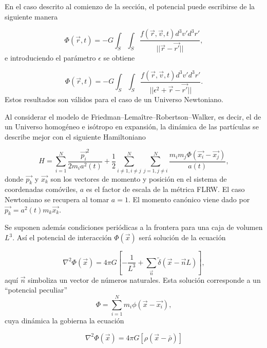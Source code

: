 \documentclass[a4paper,openright,12pt]{book}
\begin{document}
En el caso descrito al comienzo de la sección, el potencial puede escribirse de la siguiente manera

\begin{equation}
  \Phi(\vec{r},t)
  = -G
  \int_{S}\int_{S}
  \frac{f(\vec{r}, \vec{v}, t)d^{3}v'd^{3}r'}{||\vec{r}-\vec{r'}||},\label{eqn2.8}
\end{equation}
e introduciendo el parámetro $\epsilon$ se obtiene

\begin{equation}
 \Phi(\vec{r},t)
  = -G
  \int_{S}\int_{S}
  \frac{f(\vec{r}, \vec{v}, t)d^{3}v'd^{3}r'}{||\epsilon^{2} + \vec{r}-\vec{r'}||}.\label{eqn2.9}
\end{equation}
Estos resultados son válidos para el caso de un Universo Newtoniano.

Al considerar el modelo de Friedman--Lemaître--Robertson--Walker, es decir, el de un Universo homogéneo e isótropo en expansión, la dinámica de las partículas se describe mejor con el siguiente Hamiltoniano

\begin{equation}
  H 
  = \sum_{i=1}^{N} \frac{\vec{p_{i}}^{2}}{2 m_{i} a^{2}(t)} 
  +
  \frac{1}{2} \sum_{i\not=1,i\not=j}^{N}\sum_{j=1,j\not=i}^{N}
  \frac{m_{i}m_{j}\Phi(\vec{x_{i}}-\vec{x_{j}})}{a(t)},\label{eqn2.10}
\end{equation}
donde $\vec{p_{k}}$ y $\vec{x_{k}}$ son los vectores de momento y posición en el sistema de coordenadas comóviles, $a$ es el factor de escala de la métrica FLRW. El caso Newtoniano se recupera al tomar $a = 1$. El momento canónico viene dado por $\vec{p_{k}} = a^{2}(t)m_{k}\vec{x_{k}}$.

Se suponen además condiciones periódicas a la frontera para una caja de volumen $L^{3}$. Así el potencial de interacción $\Phi(\vec{x})$ será solución de la ecuación

\begin{equation}
 \nabla^{2}\Phi(\vec{x})
 =
 4\pi G
 \left[
 -\frac{1}{L^{3}}
 +
 \sum_{\vec{n}} \tilde{\delta}(\vec{x}-\vec{n}L)
 \right],\label{eqn2.11}
\end{equation}
aquí $\vec{n}$ simboliza un vector de números naturales. Esta solución corresponde a un “potencial peculiar”
\begin{equation}
 \Phi
 =
 \sum_{i=1}^{N} m_{i} \phi(\vec{x}-\vec{x_{i}}),\label{eqn2.12}
\end{equation}
cuya dinámica la gobierna la ecuación

\begin{equation}
  \nabla^{2}\Phi(\vec{x})
  =
  4 \pi G
  [\rho(\vec{x}-\bar{\rho})]\label{eqn2.13}
\end{equation}
\end{document}
